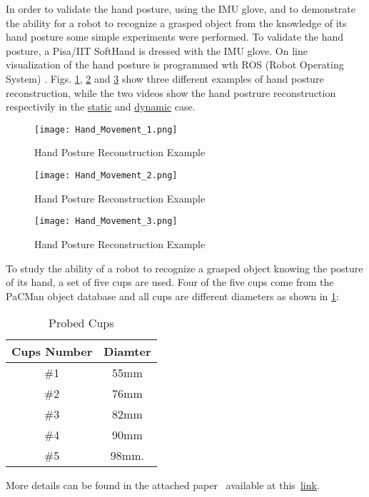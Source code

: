 In order to validate the hand posture, using the IMU glove, and to demonstrate the ability for a robot to recognize a grasped object from the knowledge of its hand posture some simple experiments were performed.
To validate the hand posture, a Pisa/IIT SoftHand is dressed with the IMU glove. On line visualization of the hand posture is programmed wth ROS (Robot Operating System) \cite{riferimento}. Figs. \ref{fig:hand_reconstruction_1}, \ref{fig:hand_reconstruction_2} and \ref{fig:hand_reconstruction_3} show three different examples of hand posture reconstruction, while the two videos show the hand postrure reconstruction respectivily in the \href{https://www.youtube.com/watch?v=0oVha0Q1vWM}{static} and \href{https://www.youtube.com/watch?v=bceOXa990-Q}{dynamic} case.

\begin{figure}[h]
\centering
\texttt{[image: Hand\_Movement\_1.png]}
\caption{Hand Posture Reconstruction Example}
\label{fig:hand_reconstruction_1}
\end{figure} 

\begin{figure}[h]
\centering
\texttt{[image: Hand\_Movement\_2.png]}
\caption{Hand Posture Reconstruction Example}
\label{fig:hand_reconstruction_2}
\end{figure} 

\begin{figure}[h]
\centering
\texttt{[image: Hand\_Movement\_3.png]}
\caption{Hand Posture Reconstruction Example}
\label{fig:hand_reconstruction_3}
\end{figure} 

To study the ability of a robot to recognize a grasped object knowing the posture of its hand, a set of five cups are used. Four of the five cups come from the PaCMan object database and all cups are different diameters as shown in \ref{tab:cups}:

\begin{table}[tb]\footnotesize
\begin{tabular}{cc} \hline \hline
Cups Number & Diamter \\ \hline
\#1 & 55mm \\
\#2 & 76mm \\
\#3 & 82mm \\
\#4 & 90mm \\
\#5 & 98mm.
\end{tabular}
\caption{Probed Cups}
\label{tab:cups}
\end{table}


More details can be found in the attached paper~\cite{Santaera:ICRA:2015} available at this~\href{./attachedPapers/ReconstructionPosturesImuMeasurements.pdf}{link}.
